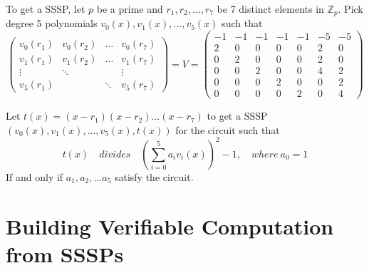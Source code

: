 \documentclass[lnbip]{svmultln}
\begin{document}
To get a SSSP, let $p$ be a prime and $r_1,r_2,...,r_7$ be 7 distinct elements in $\mathbb{Z}_p$. Pick degree 5 polynomials $v_0(x),v_1(x),...,v_5(x)$ such that
$$
\begin{pmatrix} 

v_0(r_1) & v_0(r_2) & \dots & v_0(r_7) \\
v_1(r_1) & v_1(r_2) & \dots & v_1(r_7) \\
\vdots   & \ddots   &       & \vdots   \\
v_5(r_1) &          & \ddots& v_5(r_7) 
\end{pmatrix}
= V =
\begin{pmatrix} 
-1 & -1 & -1 & -1 & -1 & -5 & -5 \\
2 & 0 & 0 & 0 & 0 & 2 & 0 \\
0 & 2 & 0 & 0 & 0 & 2 & 0 \\
0 & 0 & 2 & 0 & 0 & 4 & 2 \\
0 & 0 & 0 & 2 & 0 & 0 & 2 \\
0 & 0 & 0 & 0 & 2 & 0 & 4 
\end{pmatrix}
$$

Let $t(x)=(x-r_1)(x-r_2)...(x-r_7)$ to get a SSSP $(v_0(x),v_1(x),...,v_5(x),t(x))$ for the circuit such that
$$t(x)\quad divides\quad \left(\sum\limits_{i=0}^5a_i v_i(x)\right)^2-1, \quad where ~ a_0=1$$
If and only if $a_1,a_2,...a_5$ satisfy the circuit.


\section{Building Verifiable Computation from SSSPs}
\end{document}
